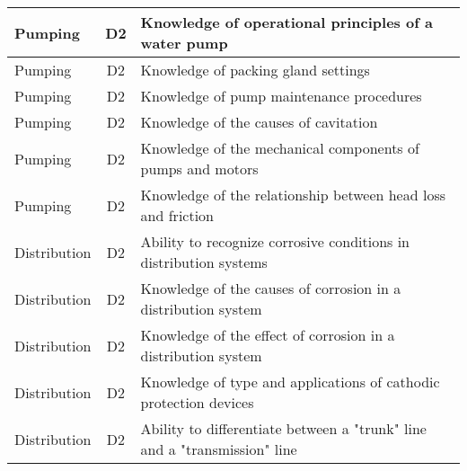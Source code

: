 \documentclass{article}
\begin{document}
\begin{table}[]
\begin{tabular}{|l|c|l|}
Pumping                                & D2             & Knowledge of   operational principles of a water pump                                                                             \\ \hline
Pumping                                & D2             & Knowledge of packing   gland settings                                                                                             \\ \hline
Pumping                                & D2             & Knowledge of pump   maintenance procedures                                                                                        \\ \hline
Pumping                                & D2             & Knowledge of the   causes of cavitation                                                                                           \\ \hline
Pumping                                & D2             & Knowledge of the   mechanical components of pumps and motors                                                                      \\ \hline
Pumping                                & D2             & Knowledge of the   relationship between head loss and friction                                                                    \\ \hline
Distribution                           & D2             & Ability to recognize   corrosive conditions in distribution systems                                                               \\ \hline
Distribution                           & D2             & Knowledge of the   causes of corrosion in a distribution system                                                                   \\ \hline
Distribution                           & D2             & Knowledge of the   effect of corrosion in a distribution system                                                                   \\ \hline
Distribution                           & D2             & Knowledge of type and   applications of cathodic protection devices                                                               \\ \hline
Distribution                           & D2             & Ability to   differentiate between a "trunk" line and a "transmission"   line                                                     \\ \hline

\end{tabular}
\end{table}
\end{document}
